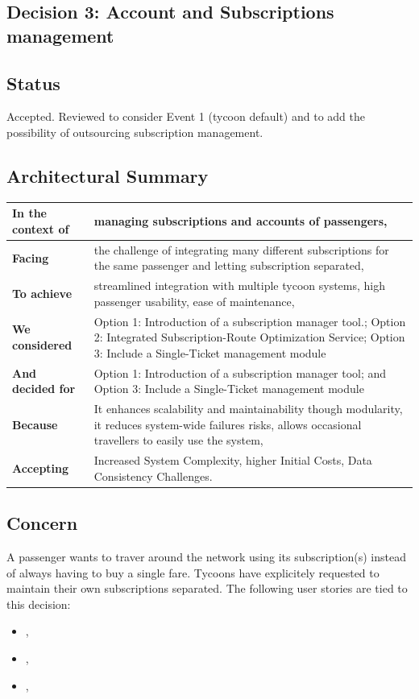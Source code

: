 \subsection{Decision 3: Account and Subscriptions management}

\subsection*{Status}
Accepted. Reviewed to consider Event 1 (tycoon default) and to add the possibility of outsourcing subscription management.

\subsection*{Architectural Summary}
\begin{tabular}{|p{3.5cm}|p{10.5cm}|}
    \hline
    \textbf{In the context of} & managing subscriptions and accounts of passengers, \\
    \hline
    \textbf{Facing} & the challenge of integrating many different subscriptions for the same passenger and letting subscription separated, \\
    \hline
    \textbf{To achieve} & streamlined integration with multiple tycoon systems, high passenger usability, ease of maintenance, \\
    \hline
    \textbf{We considered} & Option 1: Introduction of a subscription manager tool.; Option 2: Integrated Subscription-Route Optimization Service; Option 3: Include a Single-Ticket management module\\
    \hline
    \textbf{And decided for} & Option 1: Introduction of a subscription manager tool; and Option 3: Include a Single-Ticket management module  \\
    \hline
    \textbf{Because} & It enhances scalability and maintainability though modularity, it reduces system-wide failures risks, allows occasional travellers to easily use the system, \\
    \hline
    \textbf{Accepting} & Increased System Complexity, higher Initial Costs, Data Consistency Challenges. \\
    \hline
\end{tabular}

\subsection*{Concern}
A passenger wants to traver around the network using its subscription(s) instead of always having to buy a single fare.
Tycoons have explicitely requested to maintain their own subscriptions separated.
The following user stories are tied to this decision:
\begin{itemize}[noitemsep]
    \item \userStorySixteen,
    \item \userStoryTwentyThree,
    \item \userStoryThirty,
\end{itemize}

